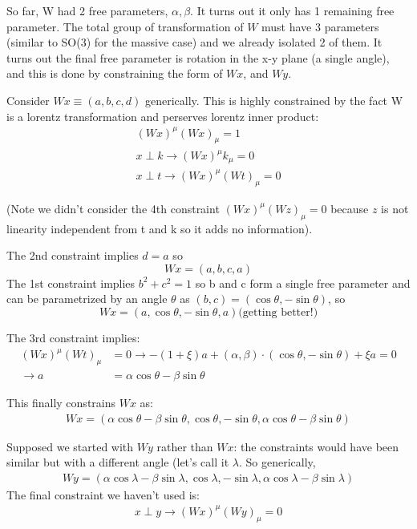 \documentclass[12pt]{scrartcl}
\begin{document}
So far, W had 2 free parameters, $\alpha, \beta$.  It turns out it only has 1 remaining free parameter. The total group of transformation of $W$ must have 3 parameters (similar to SO(3) for the massive case) and we already isolated 2 of them.  It turns out the final free parameter is rotation in the x-y plane (a single angle), and this is done by constraining the form of $Wx$, and $Wy$.

Consider $Wx \equiv (a, b, c, d)$ generically.  This is highly constrained by the fact W is a lorentz transformation and perserves lorentz inner product:
\begin{align}
(Wx)^\mu (Wx)_\mu = 1 \\
x \perp k \rightarrow (Wx)^\mu k_\mu = 0 \\
x \perp t \rightarrow (Wx)^\mu (Wt)_\mu = 0
\end{align}

(Note we didn't consider the 4th constraint $(Wx)^\mu (Wz)_\mu = 0$ because $z$ is not linearity independent from t and k so it adds no information).

The 2nd constraint implies $d = a$ so
$$Wx = (a, b, c, a)$$
The 1st constraint implies $b^2 + c^2 = 1$ so b and c form a single free parameter and can be parametrized by an angle $\theta$ as $(b, c) = (\cos \theta, -\sin \theta)$, so
$$Wx = (a, \cos \theta, - \sin \theta, a) \text{(getting better!)}$$

The 3rd constraint implies:
\begin{align}
(Wx)^\mu (Wt)_\mu &= 0 \rightarrow -(1 + \xi) a + (\alpha, \beta) \cdot (\cos \theta, -\sin \theta) + \xi a = 0 \\
\rightarrow a & = \alpha \cos \theta - \beta \sin \theta
\end{align}

This finally constrains $Wx$ as:
\begin{align}
Wx = (\alpha \cos \theta - \beta \sin \theta, \cos \theta, - \sin \theta, \alpha \cos \theta - \beta \sin \theta)
\end{align}

Supposed we started with $Wy$ rather than $Wx$:  the constraints would have been similar but with a different angle (let's call it $\lambda$.  So generically,
\begin{align}
Wy = (\alpha \cos \lambda - \beta \sin \lambda, \cos \lambda, - \sin \lambda, \alpha \cos \lambda - \beta \sin \lambda)
\end{align}
The final constraint we haven't used is:
\begin{align}
x \perp y \rightarrow (Wx)^\mu (Wy)_\mu = 0 
\end{align}
\end{document}
